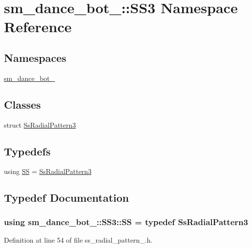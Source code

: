 \hypertarget{namespacesm__dance__bot__3_1_1SS3}{}\section{sm\+\_\+dance\+\_\+bot\+\_\+:\+:S\+S3 Namespace Reference}
\label{namespacesm__dance__bot__3_1_1SS3}
\subsection*{Namespaces}
\begin{DoxyCompactItemize}
\item 
 \hyperlink{namespacesm__dance__bot__3_1_1SS3_1_1sm__dance__bot__3}{sm\+\_\+dance\+\_\+bot\+\_}
\end{DoxyCompactItemize}
\subsection*{Classes}
\begin{DoxyCompactItemize}
\item 
struct \hyperlink{structsm__dance__bot__3_1_1SS3_1_1SsRadialPattern3}{Ss\+Radial\+Pattern3}
\end{DoxyCompactItemize}
\subsection*{Typedefs}
\begin{DoxyCompactItemize}
\item 
using \hyperlink{namespacesm__dance__bot__3_1_1SS3_a1980df51e516f1d0f9191faabf472409}{SS} = \hyperlink{structsm__dance__bot__3_1_1SS3_1_1SsRadialPattern3}{Ss\+Radial\+Pattern3}
\end{DoxyCompactItemize}


\subsection{Typedef Documentation}
\subsubsection[{\texorpdfstring{SS}{SS}}]{\setlength{\rightskip}{0pt plus 5cm}using {\bf sm\+\_\+dance\+\_\+bot\+\_\+::\+S\+S3\+::\+SS} = typedef {\bf Ss\+Radial\+Pattern3}}\hypertarget{namespacesm__dance__bot__3_1_1SS3_a1980df51e516f1d0f9191faabf472409}{}\label{namespacesm__dance__bot__3_1_1SS3_a1980df51e516f1d0f9191faabf472409}


Definition at line 54 of file ss\+\_\+radial\+\_\+pattern\+\_.\+h.


